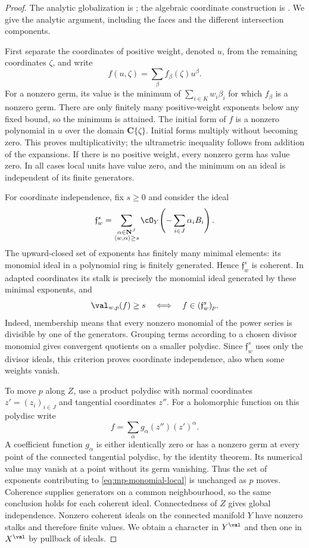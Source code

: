 \begin{proof}
The analytic globalization is
\cite[Proposition~2.3.4]{MPTropicalV2}; the algebraic coordinate
construction is \cite[Proposition~3.1]{JM12}. We give the analytic
argument, including the faces and the different intersection components.

First separate the coordinates of positive weight, denoted $u$, from
the remaining coordinates $\zeta$, and write
\[
                  f(u,\zeta)=\sum_\beta f_\beta(\zeta)u^\beta.
\]
For a nonzero germ, its value is the minimum of
$\sum_{i\in K}w_i\beta_i$ for which $f_\beta$ is a nonzero germ.
There are only finitely many positive-weight exponents below any
fixed bound, so the minimum is attained. The initial form of $f$
is a nonzero polynomial in $u$ over the domain $\mathbf C\{\zeta\}$.
Initial forms multiply without becoming zero. This proves
multiplicativity; the ultrametric inequality follows from addition
of the expansions. If there is no positive weight, every nonzero
germ has value zero. In all cases local units have value zero, and
the minimum on an ideal is independent of its finite generators.

For coordinate independence, fix $s\geq0$ and consider the ideal
\[
 \mathfrak f_w^s
   =\sum_{\substack{\alpha\in\mathbf N^J\\
                     \langle w,\alpha\rangle\geq s}}
           \cO_Y\!\left(-\sum_{i\in J}\alpha_i B_i\right).
\]
The upward-closed set of exponents has finitely many minimal
elements: its monomial ideal in a polynomial ring is finitely
generated. Hence $\mathfrak f_w^s$ is coherent. In adapted
coordinates its stalk is precisely the monomial ideal generated by
these minimal exponents, and
\[
          \val_{w,p}(f)\geq s
          \quad\Longleftrightarrow\quad
          f\in(\mathfrak f_w^s)_p.
\]
Indeed, membership means that every nonzero monomial of the power
series is divisible by one of the generators. Grouping terms
according to a chosen divisor monomial gives convergent quotients
on a smaller polydisc. Since $\mathfrak f_w^s$ uses only the
divisor ideals, this criterion proves coordinate independence,
also when some weights vanish.

To move $p$ along $Z$, use a product polydisc with normal
coordinates $z'=(z_i)_{i\in J}$ and tangential coordinates $z''$.
For a holomorphic function on this polydisc write
\[
                     f=\sum_\alpha g_\alpha(z'')(z')^\alpha.
\]
A coefficient function $g_\alpha$ is either identically zero or
has a nonzero germ at every point of the connected tangential
polydisc, by the identity theorem. Its numerical value may vanish
at a point without its germ vanishing. Thus the set of exponents
contributing to \eqref{eq:mp-monomial-local} is unchanged as
$p$ moves. Coherence supplies generators on a common neighbourhood,
so the same conclusion holds for each coherent ideal. Connectedness
of $Z$ gives global independence. Nonzero coherent ideals on the
connected manifold $Y$ have nonzero stalks and therefore finite
values. We obtain a character in $Y^{\val}$ and then one in
$X^{\val}$ by pullback of ideals.


\end{proof}
